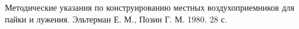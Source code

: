    Методические указания по конструированию
                                        местных воздухоприемников для пайки и лужения.
                                        Эльтерман Е. М., Позин Г. М.
                                        1980. 28 с.

